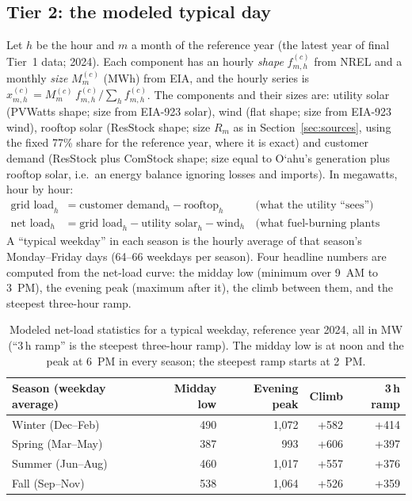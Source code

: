 \documentclass[11pt,a4paper]{article}
\newcommand{\okina}{\textquoteleft}
\newcommand{\Oahu}{\texorpdfstring{O\okina ahu}{Oahu}}
\begin{document}
\subsection{Tier 2: the modeled typical day}
Let $h$ be the hour and $m$ a month of the reference year (the latest year of final Tier~1 data; 2024). Each
component has an hourly \emph{shape} $f^{(c)}_{m,h}$ from NREL and a monthly \emph{size} $M^{(c)}_m$ (MWh)
from EIA, and the hourly series is $x^{(c)}_{m,h} = M^{(c)}_m\,f^{(c)}_{m,h}/\sum_h f^{(c)}_{m,h}$. The
components and their sizes are: utility solar (PVWatts shape; size from EIA-923 solar), wind (flat shape; size from
EIA-923 wind), rooftop solar (ResStock shape; size $R_m$ as in Section~\ref{sec:sources}, using the fixed
77\% share for the reference year, where it is exact) and customer demand (ResStock plus ComStock shape; size
equal to \Oahu's generation plus rooftop solar, i.e.\ an energy balance ignoring losses and imports). In megawatts,
hour by hour:
\begin{align}
\text{grid load}_h &= \text{customer demand}_h - \text{rooftop}_h && \text{(what the utility ``sees'')}\\
\text{net load}_h &= \text{grid load}_h - \text{utility solar}_h - \text{wind}_h && \text{(what fuel-burning plants supply)}
\end{align}
A ``typical weekday'' in each season is the hourly average of that season's Monday--Friday days (64--66
weekdays per season). Four headline numbers are computed from the net-load curve: the midday low (minimum over 9~AM
to 3~PM), the evening peak (maximum after it), the climb between them, and the steepest three-hour ramp.

\begin{table}[htbp]
\centering\small\setlength{\tabcolsep}{4pt}
\begin{tabular}{@{}lrrrr@{}}
\toprule
Season (weekday average) & Midday low & Evening peak & Climb & 3\,h ramp\\
\midrule
Winter (Dec--Feb) & 490 & 1,072 & +582 & +414\\
Spring (Mar--May) & 387 & 993 & +606 & +397\\
Summer (Jun--Aug) & 460 & 1,017 & +557 & +376\\
Fall (Sep--Nov) & 538 & 1,064 & +526 & +359\\
\bottomrule
\end{tabular}
\caption{Modeled net-load statistics for a typical weekday, reference year 2024, all in MW (``3\,h ramp'' is the
steepest three-hour ramp). The midday low is at noon and the peak at 6~PM in every season; the steepest ramp starts at 2~PM.}
\label{tab:duck}
\end{table}
\end{document}
